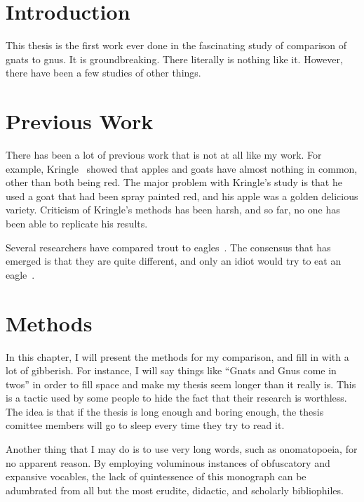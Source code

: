 \documentclass[12pt]{thesis}
\begin{document}
\body


\chapter{Introduction}
This thesis is the first work ever done in 
the fascinating study of comparison of gnats to gnus.
It is groundbreaking.  There literally is nothing
like it.   However, there have been a few studies
of other things.

\chapter{Previous Work}


There has been a lot of previous work that is not at all like my work.
For example,
\ifthesiscitations
{} %
\else
Kringle~\cite{Kringle} %
\fi
showed that apples and goats have almost
nothing in common, other than both being red.  The major problem with
Kringle's study is that he used a goat that had been spray painted
red, and his apple was a golden delicious variety.  Criticism of
Kringle's methods has been harsh, and so far, no one has been able to
replicate his results.

Several researchers have compared trout to
eagles~\cite{Simmons,Sheppard}.  The consensus that has emerged is
that they are quite different, and only an idiot would try to eat an
eagle~\cite{Idiot}.

\chapter{Methods}
In this chapter, I will present the methods for my comparison, and
fill in with a lot of gibberish.  For instance, I will say things like
``Gnats and Gnus come in twos'' in order to fill space and make my
thesis seem longer than it really is.  This is a tactic used by some
people to hide the fact that their research is worthless.  The idea is
that if the thesis is long enough and boring enough, the thesis
comittee members will go to sleep every time they try to read it.

Another thing that I may do is to use very long words, such as
onomatopoeia, for no apparent reason.  By employing voluminous
instances of obfuscatory and expansive vocables, the lack of
quintessence of this monograph can be adumbrated from all but
the most erudite, didactic, and scholarly bibliophiles.
\end{document}
